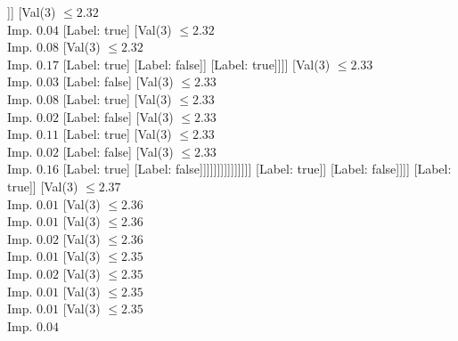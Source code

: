 \documentclass[margin=10pt]{standalone}
\begin{document}
\begin{forest}
																										[Val($3$) $ \leq 2.32$ \\ Imp. $0.06$
																											[Label: false]
																											[Val($3$) $ \leq 2.32$ \\ Imp. $0.44$
																												[Label: true]
																												[Label: false]]]
																										[Val($3$) $ \leq 2.32$ \\ Imp. $0.04$
																											[Label: true]
																											[Val($3$) $ \leq 2.32$ \\ Imp. $0.08$
																												[Val($3$) $ \leq 2.32$ \\ Imp. $0.17$
																													[Label: true]
																													[Label: false]]
																												[Label: true]]]]
																									[Val($3$) $ \leq 2.33$ \\ Imp. $0.03$
																										[Label: false]
																										[Val($3$) $ \leq 2.33$ \\ Imp. $0.08$
																											[Label: true]
																											[Val($3$) $ \leq 2.33$ \\ Imp. $0.02$
																												[Label: false]
																												[Val($3$) $ \leq 2.33$ \\ Imp. $0.11$
																													[Label: true]
																													[Val($3$) $ \leq 2.33$ \\ Imp. $0.02$
																														[Label: false]
																														[Val($3$) $ \leq 2.33$ \\ Imp. $0.16$
																															[Label: true]
																															[Label: false]]]]]]]]]]]]]]]
																	[Label: true]]
																[Label: false]]]]
													[Label: true]]
												[Val($3$) $ \leq 2.37$ \\ Imp. $0.01$
													[Val($3$) $ \leq 2.36$ \\ Imp. $0.01$
														[Val($3$) $ \leq 2.36$ \\ Imp. $0.02$
															[Val($3$) $ \leq 2.36$ \\ Imp. $0.01$
																[Val($3$) $ \leq 2.35$ \\ Imp. $0.02$
																	[Val($3$) $ \leq 2.35$ \\ Imp. $0.01$
																		[Val($3$) $ \leq 2.35$ \\ Imp. $0.01$
																			[Val($3$) $ \leq 2.35$ \\ Imp. $0.04$

\end{forest}
\end{document}
